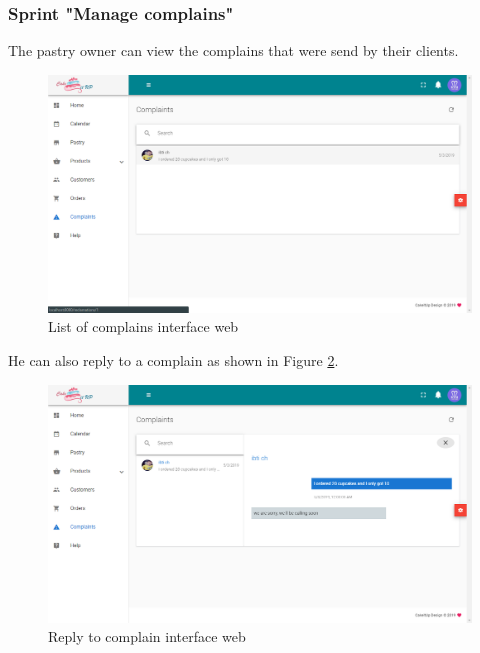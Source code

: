 \documentclass[12pt,a4paper]{report}
\begin{document}
\subsubsection*{Sprint "Manage complains"}
The pastry owner can view the complains that were send by their clients.
\begin{figure}[H]
	\centering
	\includegraphics[width=5.6in,keepaspectratio]{complainslist.png}
	\caption{List of complains interface web}
	\label{complainslist-interface}
\end{figure}
He can also reply to a complain as shown in Figure \ref{replytocomplain-interface}.
\begin{figure}[H]
	\centering
	\includegraphics[width=5.6in,keepaspectratio]{replytocomplain.png}
	\caption{Reply to complain interface web}
	\label{replytocomplain-interface}
\end{figure}
\end{document}
